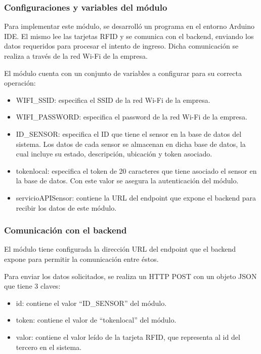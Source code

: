 \clearpage
\subsubsection{Configuraciones y variables del módulo}

Para implementar este módulo, se desarrolló un programa en el entorno Arduino IDE. El mismo lee las tarjetas RFID y se comunica con el backend, enviando los datos requeridos para procesar el intento de ingreso. Dicha comunicación se realiza a través de la red Wi-Fi de la empresa.


El módulo cuenta con un conjunto de variables a configurar para su correcta operación:

\begin{itemize}
\item WIFI\_SSID: especifica el SSID de la red Wi-Fi de la empresa.
\item WIFI\_PASSWORD: especifica el password de la red Wi-Fi de la empresa.
\item ID\_SENSOR: especifica el ID que tiene el sensor en la base de datos del sistema. Los datos de cada sensor se almacenan en dicha base de datos, la cual incluye su estado, descripción, ubicación y token asociado.
\item tokenlocal: especifica el token de 20 caracteres que tiene asociado el sensor en la base de datos. Con este valor se asegura la autenticación del módulo.
\item servicioAPISensor: contiene la URL del endpoint que expone el backend para recibir los datos de este módulo.
\end{itemize}

\subsubsection{Comunicación con el backend}

El módulo tiene configurada la dirección URL del endpoint que el backend expone para permitir la comunicación entre éstos.

Para enviar los datos solicitados, se realiza un HTTP POST con un objeto JSON que tiene 3 claves:

\begin{itemize}
\item id: contiene el valor ``ID\_SENSOR'' del módulo.
\item token: contiene el valor de ``tokenlocal'' del módulo.
\item valor: contiene el valor leído de la tarjeta RFID, que representa al id del tercero en el sistema.
\end{itemize}

